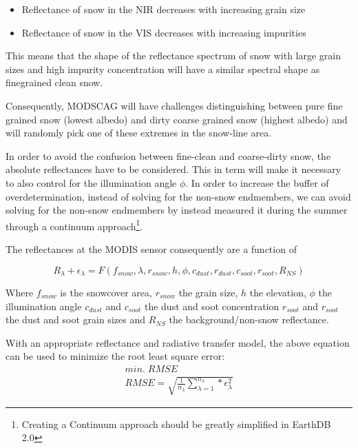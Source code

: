 \documentclass[letterpaper, parskip=half]{scrartcl}
\begin{document}
\begin{itemize}
 \item Reflectance of snow in the NIR decreases with increasing grain size
 \item Reflectance of snow in the VIS decreases with increasing impurities
\end{itemize}

This means that the shape of the reflectance spectrum of 
snow with large grain sizes and high impurity concentration will have a similar spectral shape as finegrained clean snow.

Consequently, MODSCAG will have challenges distinguishing between pure fine grained snow (lowest albedo) and dirty coarse grained snow (highest albedo) and will randomly pick one of these extremes in the snow-line area.

In order to avoid the confusion between fine-clean and coarse-dirty snow, the absolute reflectances have to be considered.
This in term will make it necessary to also control for the illumination angle $\phi$.
In order to increase the buffer of overdetermination, instead of solving for the non-snow endmembers, we can avoid solving for the non-snow endmembers by instead measured it during the summer through a continuum approach\footnote{Creating a Continuum approach should be greatly simplified in EarthDB 2.0}.

The reflectances at the MODIS sensor consequently are a function of

\begin{equation}
    R_{\lambda} + \epsilon_{\lambda} = F(f_{snow}, \lambda, r_{snow}, h, \phi, c_{dust}, r_{dust}, c_{soot}, r_{soot}, R_{NS})
\end{equation}

Where $f_{snow}$ is the snowcover area, 
$r_{snow}$ the grain size, 
$h$ the elevation,  
$\phi$ the illumination angle 
$c_{dust}$ and $c_{soot}$ the dust and soot concentration
$r_{soot}$ and $r_{soot}$ the dust and soot grain sizes
and $R_{NS}$ the background/non-snow reflectance.

With an appropriate reflectance and radiative transfer model, the above equation can be used to minimize the root least square error:
\begin{equation}
\begin{split}
min.\; RMSE \\
 RMSE = \sqrt{ \frac{1}{n_{\lambda}} \sum_{\lambda=1}^{n_\lambda} * \epsilon_{\lambda}^2}
 \end{split}
\end{equation}
\end{document}
